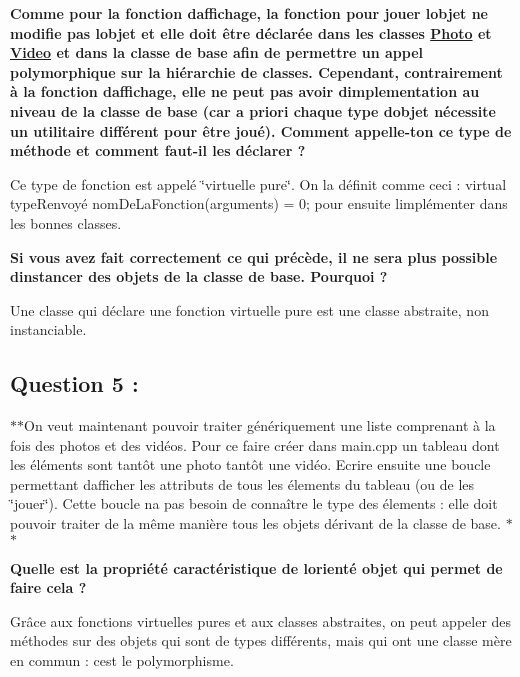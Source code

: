 {\bfseries Comme pour la fonction d\textquotesingle{}affichage, la fonction pour jouer l\textquotesingle{}objet ne modifie pas l\textquotesingle{}objet et elle doit être déclarée dans les classes \hyperlink{classPhoto}{Photo} et \hyperlink{classVideo}{Video} et dans la classe de base afin de permettre un appel polymorphique sur la hiérarchie de classes. Cependant, contrairement à la fonction d\textquotesingle{}affichage, elle ne peut pas avoir d\textquotesingle{}implementation au niveau de la classe de base (car a priori chaque type d\textquotesingle{}objet nécessite un utilitaire différent pour être joué). Comment appelle-\/t\textquotesingle{}on ce type de méthode et comment faut-\/il les déclarer ?}

Ce type de fonction est appelé \char`\"{}virtuelle pure\char`\"{}. On la définit comme ceci \+: {\ttfamily virtual type\+Renvoyé nom\+De\+La\+Fonction(arguments) = 0;} pour ensuite l\textquotesingle{}implémenter dans les bonnes classes.

{\bfseries Si vous avez fait correctement ce qui précède, il ne sera plus possible d\textquotesingle{}instancer des objets de la classe de base. Pourquoi ?}

Une classe qui déclare une fonction virtuelle pure est une classe abstraite, non instanciable.

\subsection*{Question 5 \+:}

$\ast$$\ast$\+On veut maintenant pouvoir traiter génériquement une liste comprenant à la fois des photos et des vidéos. Pour ce faire créer dans main.\+cpp un tableau dont les éléments sont tantôt une photo tantôt une vidéo. Ecrire ensuite une boucle permettant d\textquotesingle{}afficher les attributs de tous les élements du tableau (ou de les \char`\"{}jouer\char`\"{}). Cette boucle n\textquotesingle{}a pas besoin de connaître le type des élements \+: elle doit pouvoir traiter de la même manière tous les objets dérivant de la classe de base. $\ast$$\ast$

{\bfseries Quelle est la propriété caractéristique de l\textquotesingle{}orienté objet qui permet de faire cela ?}

Grâce aux fonctions virtuelles pures et aux classes abstraites, on peut appeler des méthodes sur des objets qui sont de types différents, mais qui ont une classe mère en commun \+: c\textquotesingle{}est le polymorphisme.

